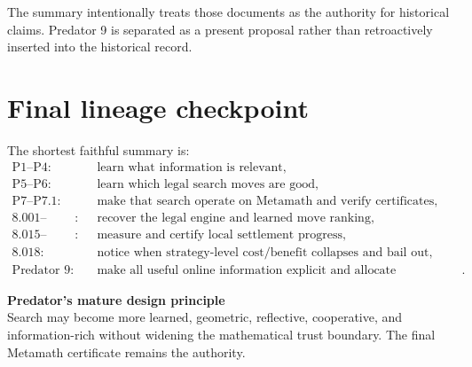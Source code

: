 \documentclass[11pt]{article}
\begin{document}
The summary intentionally treats those documents as the authority for historical claims. Predator 9 is separated as a present proposal rather than retroactively inserted into the historical record.

\section{Final lineage checkpoint}

The shortest faithful summary is:
\[
\begin{aligned}
\text{P1--P4}:&\quad \text{learn what information is relevant},\\
\text{P5--P6}:&\quad \text{learn which legal search moves are good},\\
\text{P7--P7.1}:&\quad \text{make that search operate on Metamath and verify certificates},\\
\text{8.001--8.002}:&\quad \text{recover the legal engine and learned move ranking},\\
\text{8.015--8.017}:&\quad \text{measure and certify local settlement progress},\\
\text{8.018}:&\quad \text{notice when strategy-level cost/benefit collapses and bail out},\\
\text{Predator 9}:&\quad \text{make all useful online information explicit and allocate computation accordingly}.
\end{aligned}
\]

\begin{keybox}
\centering
\textbf{Predator's mature design principle}\\[2mm]
Search may become more learned, geometric, reflective, cooperative, and information-rich without widening the mathematical trust boundary. The final Metamath certificate remains the authority.
\end{keybox}
\end{document}
